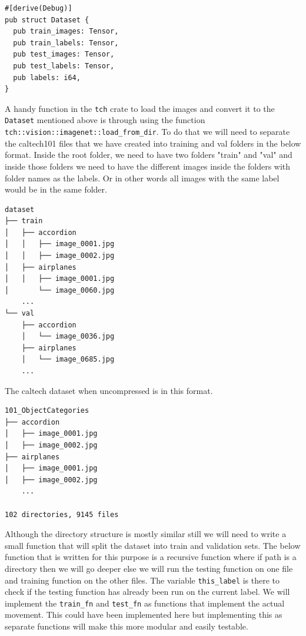 \documentclass{book}
\begin{document}
\begin{lstlisting}[caption={tch-rs/src/vision/dataset.rs}, basicstyle=\small]
#[derive(Debug)]
pub struct Dataset {
  pub train_images: Tensor,
  pub train_labels: Tensor,
  pub test_images: Tensor,
  pub test_labels: Tensor,
  pub labels: i64,
}
\end{lstlisting}

A handy function in the \lstinline{tch} crate to load the images and convert it to the \lstinline{Dataset} mentioned above is through using the function \lstinline{tch::vision::imagenet::load_from_dir}. To do that we will need to separate the caltech101 files that we have created into training and val folders in the below format. Inside the root folder, we need to have two folders "train" and "val" and inside those folders we need to have the different images inside the folders with folder names as the labels. Or in other words all images with the same label would be in the same folder.

\begin{lstlisting}[caption={}, basicstyle=\tiny]
dataset
├── train
│   ├── accordion
│   │   ├── image_0001.jpg
│   │   ├── image_0002.jpg
│   ├── airplanes
│   │   ├── image_0001.jpg
│       └── image_0060.jpg
	...
└── val
    ├── accordion
    │   └── image_0036.jpg
    ├── airplanes
    │   └── image_0685.jpg
	...
\end{lstlisting}

The caltech dataset when uncompressed is in this format.

\begin{lstlisting}[caption={}, basicstyle=\tiny]
101_ObjectCategories
├── accordion
│   ├── image_0001.jpg
│   ├── image_0002.jpg
├── airplanes
│   ├── image_0001.jpg
│   ├── image_0002.jpg
    ...

102 directories, 9145 files
\end{lstlisting}

Although the directory structure is mostly similar still we will need to write a small function that will split the dataset into train and validation sets. The below function that is written for this purpose is a recursive function where if path is a directory then we will go deeper else we will run the testing function on one file and training function on the other files. The variable \lstinline{this_label} is there to check if the testing function has already been run on the current label. We will implement the \lstinline{train_fn} and \lstinline{test_fn} as functions that implement the actual movement. This could have been implemented here but implementing this as separate functions will make this more modular and easily testable.
\end{document}
